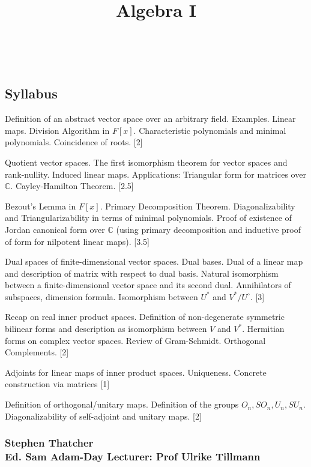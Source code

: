 \documentclass[11pt, a4paper]{report}
\title{Algebra I}
\numberwithin{equation}{section}
\numberwithin{equation}{subsection}
\theoremstyle{plain}
\theoremstyle{definition}
\theoremstyle{remark}
\begin{document}
\setlength{\parindent}{0pt}
\begin{titlepage}
\\[18pt]
\vfill

\subsection*{Syllabus}

Definition of an abstract vector space over an arbitrary field. Examples. Linear maps. Division Algorithm in $ F[x] $. Characteristic polynomials and minimal polynomials. Coincidence of roots. [2]

Quotient vector spaces. The first isomorphism theorem for vector spaces and rank-nullity. Induced linear maps. Applications: Triangular form for matrices over $ \mathbb{C} $. Cayley-Hamilton Theorem. [2.5]

Bezout's Lemma in $ F[x] $. Primary Decomposition Theorem. Diagonalizability and Triangularizability in terms of minimal polynomials. Proof of existence of Jordan canonical form over $ \mathbb{C} $ (using primary decomposition and inductive proof of form for nilpotent linear maps). [3.5]

Dual spaces of finite-dimensional vector spaces. Dual bases. Dual of a linear map and description of matrix with respect to dual basis. Natural isomorphism between a finite-dimensional vector space and its second dual. Annihilators of subspaces, dimension formula. Isomorphism between $ U^* $ and $ V^* / U^\circ $. [3]

Recap on real inner product spaces. Definition of non-degenerate symmetric bilinear forms and description as isomorphism between $ V $ and $ V^* $. Hermitian forms on complex vector spaces. Review of Gram-Schmidt. Orthogonal Complements. [2]

Adjoints for linear maps of inner product spaces. Uniqueness. Concrete construction via matrices [1]

Definition of orthogonal/unitary maps. Definition of the groups $ O_n, SO_n,U_n, SU_n $. Diagonalizability of self-adjoint and unitary maps. [2]

\vfill
\subsubsection*{Stephen Thatcher \\Ed. Sam Adam-Day \hfill Lecturer: Prof Ulrike Tillmann}
\end{titlepage}
\end{document}
